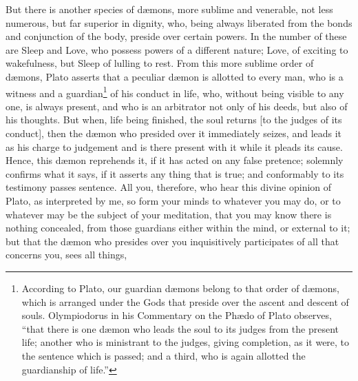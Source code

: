\documentclass{article}
\begin{document}
But there is another species of d{\ae}mons, more sublime and venerable, not
less numerous, but far superior in dignity, who, being always liberated from
the bonds and conjunction of the body, preside over certain powers. In the
number of these are Sleep and Love, who possess powers of a different nature;
Love, of exciting to wakefulness, but Sleep of lulling to rest. From this more
sublime order of d{\ae}mons, Plato asserts that a peculiar d{\ae}mon is
allotted to every man, who is a witness and a guardian\footnote{According to
Plato, our guardian d{\ae}mons belong to that order of d{\ae}mons, which is
arranged under the Gods that preside over the ascent and descent of souls.
Olympiodorus in his Commentary on the Ph{\ae}do of Plato observes,
``that there is one d{\ae}mon who leads the soul to its judges from the present
life; another who is ministrant to the judges, giving completion, as it were,
to the sentence which is passed; and a third, who is again allotted the
guardianship of life.''} of his conduct in life, who, without being visible to
any one, is always present, and who is an arbitrator not only of his deeds, but
also of his thoughts.  But when, life being finished, the soul returns [to the
judges of its conduct], then the d{\ae}mon who presided over it immediately
seizes, and leads it as his charge to judgement and is there present with it
while it pleads its cause. Hence, this d{\ae}mon reprehends it, if it has acted
on any false pretence; solemnly confirms what it says, if it asserts any thing
that is true; and conformably to its testimony passes sentence. All you,
therefore, who hear this divine opinion of Plato, as interpreted by me, so form
your minds to whatever you may do, or to whatever may be the subject of your
meditation, that you may know there is nothing concealed, from those guardians
either within the mind, or external to it; but that the d{\ae}mon who presides
over you inquisitively participates of all that concerns you, sees all things,
\end{document}
